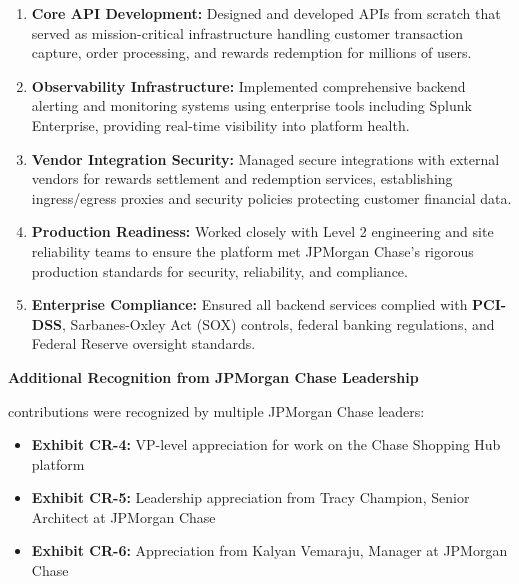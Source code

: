 \begin{enumerate}
    \item \textbf{Core API Development:} Designed and developed APIs from scratch that served as mission-critical infrastructure handling customer transaction capture, order processing, and rewards redemption for millions of users.

    \item \textbf{Observability Infrastructure:} Implemented comprehensive backend alerting and monitoring systems using enterprise tools including Splunk Enterprise, providing real-time visibility into platform health.

    \item \textbf{Vendor Integration Security:} Managed secure integrations with external vendors for rewards settlement and redemption services, establishing ingress/egress proxies and security policies protecting customer financial data.

    \item \textbf{Production Readiness:} Worked closely with Level 2 engineering and site reliability teams to ensure the platform met JPMorgan Chase's rigorous production standards for security, reliability, and compliance.

    \item \textbf{Enterprise Compliance:} Ensured all backend services complied with \textbf{PCI-DSS}, Sarbanes-Oxley Act (SOX) controls, federal banking regulations, and Federal Reserve oversight standards.
\end{enumerate}

\textbf{Additional Recognition from JPMorgan Chase Leadership}

\drs contributions were recognized by multiple JPMorgan Chase leaders:

\begin{itemize}
    \item \textbf{Exhibit CR-4:} VP-level appreciation for \drs work on the Chase Shopping Hub platform \cite{CR4}
    \item \textbf{Exhibit CR-5:} Leadership appreciation from Tracy Champion, Senior Architect at JPMorgan Chase \cite{CR5}
    \item \textbf{Exhibit CR-6:} Appreciation from Kalyan Vemaraju, Manager at JPMorgan Chase \cite{CR6}
\end{itemize}


